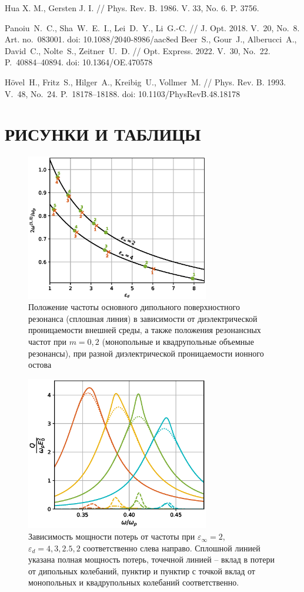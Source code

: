 \documentclass[12pt, a4paper]{article}
\def \eps {\varepsilon}
\begin{document}
\begin{thebibliography}{99}
Hua X. M., Gersten J. I. // Phys. Rev. B. 1986. V. 33, No. 6. P. 3756.


Panoiu~N.~C., Sha~W.~E.~I., Lei~D.~Y., Li~G.-C. // J. Opt. 2018. V.~20, No.~8. Art. no.~083001. doi: 10.1088/2040-8986/aac8ed
Beer~S., Gour~J., Alberucci~A., David~C., Nolte~S., Zeitner~U.~D. // Opt. Express. 2022. V.~30, No.~22. P.~40884--40894. doi: 10.1364/OE.470578

H\"{o}vel~H., Fritz~S., Hilger~A., Kreibig~U., Vollmer~M. // Phys. Rev. B. 1993. V.~48, No.~24. P.~18178--18188. doi: 10.1103/PhysRevB.48.18178

\end{thebibliography}

\newpage
\section{РИСУНКИ И ТАБЛИЦЫ}
\begin{figure}[h]
	\centering
	\includegraphics[width=80mm]{./image/fig_w.eps}
	\caption{Положение частоты основного дипольного поверхностного резонанса (сплошная линия) в зависимости от диэлектрической проницаемости внешней среды, а также положения резонансных частот при $m=0,2$ (монопольные и квадрупольные объемные резонансы), при разной диэлектрической проницаемости ионного остова}
	\label{fig_w}
\end{figure} 
\newpage
\begin{figure}[h]
	\centering
	\includegraphics[width=80mm]{./image/fig1_epsd2.eps}
	\caption{Зависимость мощности потерь от частоты при $\eps_\infty= 2$, $\eps_d = 4, 3, 2.5, 2$ соответственно слева направо. Сплошной линией указана полная мощность потерь, точечной линией – вклад в потери от дипольных колебаний, пунктир и пунктир с точкой вклад от монопольных и квадрупольных колебаний соответственно. }
	\label{fig1_epsd2}
\end{figure} 
\end{document}
